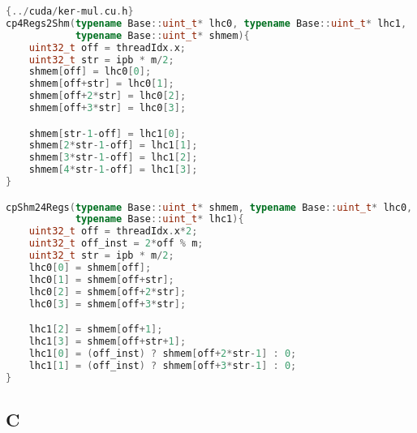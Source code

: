 \begin{lstlisting}[language=CPP,caption={\footnotesize CUDA convolution memory
transactions of \textit{convmul} with sequentialization factor of 4 to prepare
calling \textit{badd} on the four pairs of parts in registers, from file
\texttt{ker-mul.cu.h} (slightly edited), with base class \texttt{Base}, big integer size \texttt{m}, and \texttt{ipb} instances per block.},label={cudamulmem},firstnumber=106]{../cuda/ker-mul.cu.h}
cp4Regs2Shm(typename Base::uint_t* lhc0, typename Base::uint_t* lhc1,
            typename Base::uint_t* shmem){
    uint32_t off = threadIdx.x;
    uint32_t str = ipb * m/2;
    shmem[off] = lhc0[0];
    shmem[off+str] = lhc0[1];
    shmem[off+2*str] = lhc0[2];
    shmem[off+3*str] = lhc0[3];

    shmem[str-1-off] = lhc1[0];
    shmem[2*str-1-off] = lhc1[1];
    shmem[3*str-1-off] = lhc1[2];
    shmem[4*str-1-off] = lhc1[3];
}

cpShm24Regs(typename Base::uint_t* shmem, typename Base::uint_t* lhc0,
            typename Base::uint_t* lhc1){
    uint32_t off = threadIdx.x*2;
    uint32_t off_inst = 2*off % m;
    uint32_t str = ipb * m/2;
    lhc0[0] = shmem[off];
    lhc0[1] = shmem[off+str];
    lhc0[2] = shmem[off+2*str];
    lhc0[3] = shmem[off+3*str];

    lhc1[2] = shmem[off+1];
    lhc1[3] = shmem[off+str+1];
    lhc1[0] = (off_inst) ? shmem[off+2*str-1] : 0;
    lhc1[1] = (off_inst) ? shmem[off+3*str-1] : 0;
}
\end{lstlisting}

\subsection*{C}
\label{app:C}

